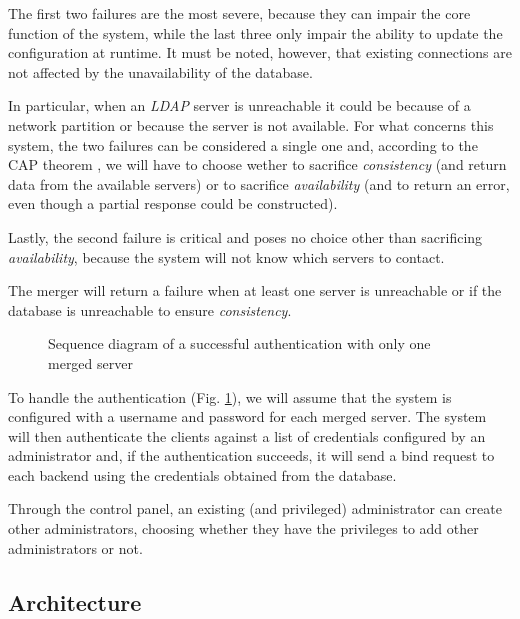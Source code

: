 \documentclass{scrartcl}
\begin{document}
\par The first two failures are the most severe, because they can impair the core function of the system, while the last three only impair the ability to update the configuration at runtime. It must be noted, however, that existing connections are not affected by the unavailability of the database.
\par In particular, when an \textit{LDAP} server is unreachable it could be because of a network partition or because the server is not available. For what concerns this system, the two failures can be considered a single one and, according to the CAP theorem \cite{6122006}, we will have to choose wether to sacrifice \textit{consistency} (and return data from the available servers) or to sacrifice \textit{availability} (and to return an error, even though a partial response could be constructed).
\par Lastly, the second failure is critical and poses no choice other than sacrificing \textit{availability}, because the system will not know which servers to contact.

\par The merger will return a failure when at least one server is unreachable or if the database is unreachable to ensure \textit{consistency}.
\begin{figure}[h]
    \centering
    
    \caption{Sequence diagram of a successful authentication with only one merged server}
    \label{fig:auth} 
\end{figure}
\par To handle the authentication (Fig. \ref{fig:auth}), we will assume that the system is configured with a username
and password for each merged server. The system will then authenticate the clients against a list of credentials configured
by an administrator and, if the authentication succeeds, it will send a bind request to each backend using the credentials
obtained from the database.
\par Through the control panel, an existing (and privileged) administrator can create other administrators, choosing whether
they have the privileges to add other administrators or not.

\subsection{Architecture}
\end{document}
